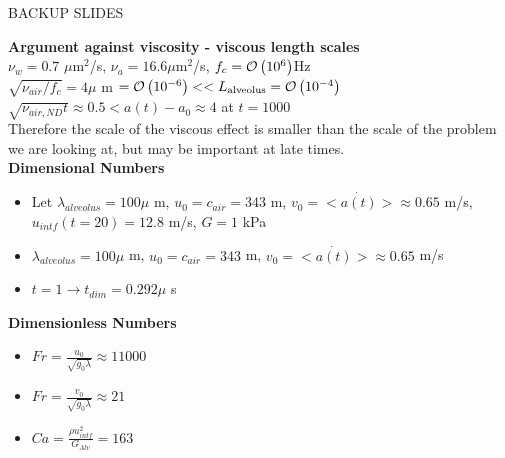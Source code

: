 \begin{frame}
  \vfill
  {\LARGE
    \begin{center}
      BACKUP SLIDES
    \end{center}
  }
  \vfill
\end{frame}

\begin{frame}%

  {\small%
    \textbf{Argument against viscosity - viscous length scales}\\
    $\nu_{w}=0.7$ $\mu$m$^2$/s,\qquad
    $\nu_{a}=16.6 \mu$m$^2$/s,\qquad
    $f_c=\mathcal{O}\left(10^6\right)$Hz\\
    $\sqrt{\nu_{air}/f_c}=4\mu$ m $=\mathcal{O}\left(10^{-6}\right) << L_{\text{alveolus}}=\mathcal{O}\left(10^{-4}\right)$\\ \vspace*{4pt}
    $\sqrt{\nu_{air,ND}t} \approx0.5 < a(t)-a_0\approx4$ at $t=1000$\\ \vspace*{4pt}  
    Therefore the scale of the viscous effect is smaller than the scale of the problem we are looking at, but may be important at late times.\\
  }    
  \vspace*{0.25cm}
  \textbf{{\small Dimensional Numbers}}
  {\small
    \begin{itemize}
    \item Let $\lambda_{alveolus}=100 \mu$ m, $u_0=c_{air}=343$ m, $v_0=<\dot{a(t)}>\approx0.65$ m/s, $u_{intf}(t=20)=12.8$ m/s, $G=1$ kPa %
    \item $\lambda_{alveolus}=100 \mu$ m, $u_0=c_{air}=343$ m, $v_0=<\dot{a(t)}>\approx0.65$ m/s
    \item $t=1 \rightarrow t_{dim}=0.292 \mu$ s
    \end{itemize}
  }
  \vspace*{0.25cm}
  \textbf{{\small Dimensionless Numbers}}
  {\small
    \begin{itemize}
    \item $Fr=\frac{u_0}{\sqrt{g_0 \lambda}}\approx11000$
    \item $Fr=\frac{v_0}{\sqrt{g_0 \lambda}}\approx21$
    \item $Ca=\frac{\rho u_{intf}^2}{G_{Alv}} = 163$
    \end{itemize}
  }
\end{frame}

